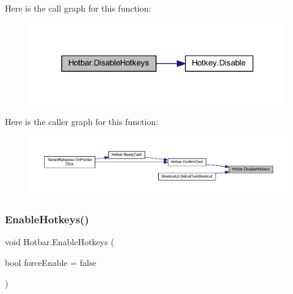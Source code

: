 Here is the call graph for this function\+:
\nopagebreak
\begin{figure}[H]
\begin{center}
\leavevmode
\includegraphics[width=315pt]{class_hotbar_a914ca0c61c4d64b0bde6e829064f71a9_cgraph}
\end{center}
\end{figure}
Here is the caller graph for this function\+:
\nopagebreak
\begin{figure}[H]
\begin{center}
\leavevmode
\includegraphics[width=350pt]{class_hotbar_a914ca0c61c4d64b0bde6e829064f71a9_icgraph}
\end{center}
\end{figure}
\mbox{\label{class_hotbar_a37bca03a1dfd144a30bae3774eaab667}} 
\subsubsection{\texorpdfstring{EnableHotkeys()}{EnableHotkeys()}}
{\footnotesize\ttfamily void Hotbar.\+Enable\+Hotkeys (\begin{DoxyParamCaption}\item[{bool}]{force\+Enable = {\ttfamily false} }\end{DoxyParamCaption})}

